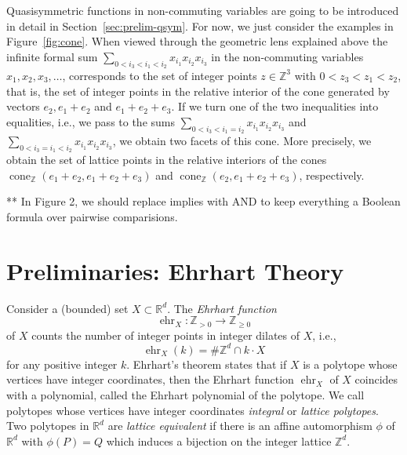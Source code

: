 \documentclass[12pt,reqno]{amsart}
\numberwithin{definition}{section}
\theoremstyle{definition}
\newcommand{\rar}{\rightarrow}
\newcommand{\RR}{\mathbb{R}}
\newcommand{\ZZ}{\mathbb{Z}}
\newcommand{\ehr}{\operatorname{ehr}}
\newcommand{\cone}{\operatorname{cone}}
\begin{document}
Quasisymmetric functions in non-commuting variables are going to be introduced in detail in Section~\ref{sec:prelim-qsym}. For now, we just consider the examples in Figure~\ref{fig:cone}. When viewed through the geometric lens explained above the infinite formal sum $\sum_{0<i_3<i_1<i_2} x_{i_1}x_{i_2}x_{i_3}$ in the non-commuting variables $x_1,x_2,x_3,\ldots$, corresponds to the set of integer points $z\in\ZZ^3$ with $0<z_3<z_1<z_2$, that is, the set of integer points in the relative interior of the cone generated by vectors $e_2,e_1+e_2$ and $e_1+e_2+e_3$. If we turn one of the two inequalities into equalities, i.e., we pass to the sums $\sum_{0<i_3<i_1 = i_2} x_{i_1}x_{i_2}x_{i_3}$ and $\sum_{0<i_3=i_1<i_2} x_{i_1}x_{i_2}x_{i_3}$, we obtain two facets of this cone. More precisely, we obtain the set of lattice points in the relative interiors of the cones $\cone_\ZZ(e_1+e_2,e_1+e_2+e_3)$ and $\cone_\ZZ(e_2,e_1+e_2+e_3)$, respectively.

** In Figure 2, we should replace implies with AND to keep everything a Boolean formula over pairwise comparisions. 

\section{Preliminaries: Ehrhart Theory}


Consider a (bounded) set $X\subset \RR^d$. The \emph{Ehrhart function} 
\[
  \ehr_X:\ZZ_{> 0}\rar\ZZ_{\geq 0}
\]
of $X$ counts the number of integer points in integer dilates of $X$, i.e., 
\[
  \ehr_X(k) = \#\ZZ^d \cap k\cdot X
\]
for any positive integer $k$. Ehrhart's theorem states that if $X$ is a polytope whose vertices have integer coordinates, then the Ehrhart function $\ehr_X$ of $X$ coincides with a polynomial, called the Ehrhart polynomial of the polytope. We call polytopes whose vertices have integer coordinates \emph{integral} or \emph{lattice polytopes}. Two polytopes in $\RR^d$ are \emph{lattice equivalent} if there is an affine automorphism $\phi$ of $\RR^d$ with $\phi(P)=Q$ which induces a bijection on the integer lattice $\ZZ^d$.
\end{document}
